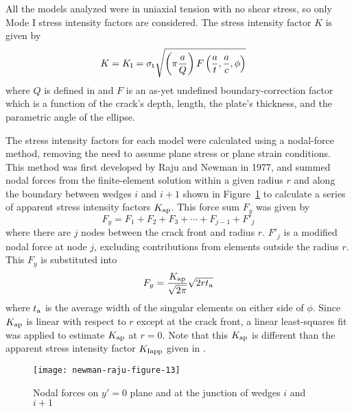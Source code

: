 All the models analyzed were in uniaxial tension with no shear stress, so only Mode I stress intensity factors are considered. The stress intensity factor $K$ is given by
\begin{align}
K &= K_\textnormal{I} = \sigma_{\textnormal{t}} \sqrt{\left( \pi \frac{a}{Q}\right) F\left(\frac{a}{t},\frac{a}{c},\phi\right)}
\end{align}
where \(Q\) is defined in  and $F$ is an as-yet undefined bound\-ary-cor\-rec\-tion factor which is a function of the crack's depth, length, the plate's thickness, and the parametric angle of the ellipse.

The stress intensity factors for each model were calculated using a nodal-force method, removing the need to assume plane stress or plane strain conditions. This method was first developed by Raju and Newman in 1977, and summed nodal forces from the finite-element solution within a given radius $r$ and along the boundary between wedges $i$ and $i+1$ shown in Figure~\ref{fig:nodal_force_method} to calculate a series of apparent stress intensity factors $K_{\textnormal{ap}}$.  This force sum $F_y$ was given by
\begin{equation}
F_y = F_1 + F_2 + F_3 + \cdots + F_{j-1} + F'_{j}
\end{equation}
where there are $j$ nodes between the crack front and radius $r$. $F'_{j}$ is a modified nodal force at node $j$, excluding contributions from elements outside the radius $r$. This $F_y$ is substituted into
\begin{equation}
F_y = \frac{K_\textnormal{ap}}{\sqrt{2\pi}} \sqrt{2 r t_\textnormal{a}}
\end{equation}
where $t_\textnormal{a}$ is the average width of the singular elements on either side of $\phi$. Since $K_\textnormal{ap}$ is linear with respect to $r$ except at the crack front, a linear least-squares fit was applied to estimate $K_\textnormal{ap}$ at $r=0$. Note that this \(K_\textnormal{ap}\) is different than the apparent stress intensity factor \(K_\textnormal{Iapp}\) given in .
\begin{figure}[tbp]
\centering
	   \texttt{[image: newman-raju-figure-13]}
      \caption[Nodal forces on $y'=0$ plane and at the junction of wedges $i$ and $i+1$]{Nodal forces on $y'=0$ plane and at the junction of wedges $i$ and $i+1$ \citep{rajunewman1979}}
      \label{fig:nodal_force_method}
\end{figure}

